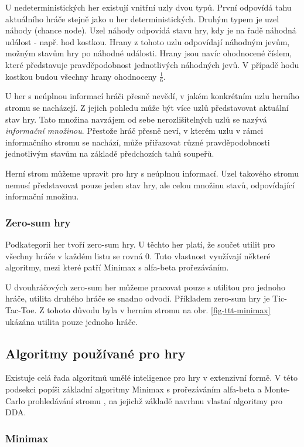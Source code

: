 U nedeterministických her existují vnitřní uzly dvou typů. První odpovídá tahu aktuálního hráče stejně jako u her deterministických. Druhým typem je uzel náhody (chance node). Uzel náhody odpovídá stavu hry, kdy je na řadě náhodná událost - např. hod kostkou. Hrany z tohoto uzlu odpovídají náhodným jevům, možným stavům hry po náhodné události. Hrany jsou navíc ohodnocené číslem, které představuje pravděpodobnost jednotlivých náhodných jevů. V případě hodu kostkou budou všechny hrany ohodnoceny $\frac{1}{6}$.

U her s neúplnou informací hráči přesně nevědí, v jakém konkrétním uzlu herního stromu se nacházejí. Z jejich pohledu může být více uzlů představovat aktuální stav hry. Tato množina navzájem od sebe nerozlišitelných uzlů se nazývá \emph{informační množinou}. Přestože hráč přesně neví, v kterém uzlu v rámci informačního stromu se nachází, může přiřazovat různé pravděpodobnosti jednotlivým stavům na základě předchozích tahů soupeřů.

Herní strom můžeme upravit pro hry s neúplnou informací. Uzel takového stromu nemusí představovat pouze jeden stav hry, ale celou množinu stavů, odpovídající informační množinu.

\subsubsection{Zero-sum hry}

Podkategorii her tvoří zero-sum hry. U těchto her platí, že součet utilit pro všechny hráče v každém listu se rovná 0. Tuto vlastnost využívají některé algoritmy, mezi které patří Minimax s alfa-beta prořezáváním.

U dvouhráčových zero-sum her můžeme pracovat pouze s utilitou pro jednoho hráče, utilita druhého hráče se snadno odvodí. Příkladem zero-sum hry je Tic-Tac-Toe. Z tohoto důvodu byla v herním stromu na obr. \ref{fig-ttt-minimax} ukázána utilita pouze jednoho hráče.

\subsection{Algoritmy používané pro hry}

Existuje celá řada algoritmů umělé inteligence pro hry v extenzivní formě. V této podsekci popíši základní algoritmy Minimax s prořezáváním alfa-beta \cite{minimax} a Monte-Carlo prohledávání stromu \cite{montecarlo}, na jejichž základě navrhnu vlastní algoritmy pro DDA.

\subsubsection{Minimax}

